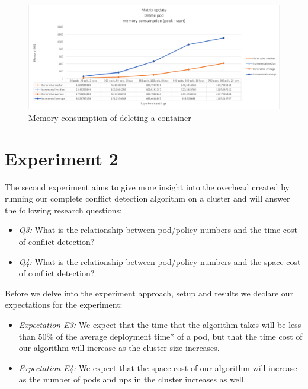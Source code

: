 \begin{figure}[H]
    \centering
    \includegraphics[width=\textwidth]{images/experiment1/delPod-memory.png}
    \caption{Memory consumption of deleting a container}
    \label{fig:exp1-delPod-memory}
\end{figure}



\section{Experiment 2}\label{sec:experiment2}
The second experiment aims to give more insight into the overhead created by running our complete conflict detection algorithm on a cluster and will answer the following research questions:

\begin{itemize}
    \item \textit{Q3:} What is the relationship between pod/policy numbers and the time cost of conflict detection?
    \item \textit{Q4:} What is the relationship between pod/policy numbers and the space cost of conflict detection?
\end{itemize}

Before we delve into the experiment approach, setup and results we declare our expectations for the experiment:

\begin{itemize}
    \item \textit{Expectation E3:} We expect that the time that the algorithm takes will be less than 50\% of the average deployment time* of a pod, but that the time cost of our algorithm will increase as the cluster size increases. 
    \item \textit{Expectation E4:} We expect that the space cost of our algorithm will increase as the number of pods and \acrshort{np}s in the cluster increases as well. 
\end{itemize}

